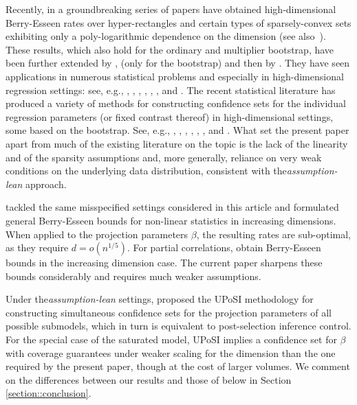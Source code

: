 \documentclass{article}
\begin{document}
 
 Recently, in a groundbreaking series of papers \cite{Cher13,chernozhukov2017detailed, chernozhukov2019improved} have obtained high-dimensional Berry-Esseen rates over hyper-rectangles and certain types of sparsely-convex sets exhibiting only a poly-logarithmic dependence on the dimension (see also~\citet{MR1115160}). These results, which also hold for the ordinary and multiplier bootstrap,   have been further extended by  \cite{2018arXiv180606153K}, \cite{hang.hzhang.bootstrap.17} (only for the bootstrap)  and then by \cite{koike2019high}. They have seen applications in numerous statistical problems and especially in high-dimensional regression settings: see, e.g., \cite{zhang2014confidence}, \cite{wasserman2014berry}, \cite{10.1093/biomet/asu056},  \cite{doi:10.1146/annurev-economics-012315-015826}, \cite{zhang2017simultaneous}, \cite{test}, \cite{boot}  and \cite{hang.hzhang.bootstrap.17}.
 The recent statistical literature has produced a variety of methods for constructing confidence sets for the individual regression parameters (or fixed contrast thereof) in high-dimensional settings, some based on the bootstrap. See, e.g., 
 \cite{javanmard2014confidence}, \cite{javanmard2018}, \cite{ning2017},  \cite{zhu2018,doi:10.1080/01621459.2017.1356319}, \cite{cai2017confidence}, \cite{ren2015}, \cite{rajen.peter.2018} and \cite{peter.sarah.2015}. 
 What set the present paper apart from much of the existing  literature on the topic is the lack of the linearity and of the sparsity assumptions and, more generally, reliance on very weak conditions on the underlying data distribution, consistent with the{\it assumption-lean} approach. 
 
 \cite{boot} tackled the same misspecified settings considered in this article and formulated general Berry-Esseen bounds for non-linear statistics 
 in increasing dimensions.
 When applied to the projection parameters $\beta$,
 the resulting rates are sub-optimal, as they require
 $d = o(n^{1/5})$.
 For partial correlations,
 \cite{wasserman2014berry}
 obtain Berry-Esseen bounds in the increasing dimension case.
 The current paper sharpens these bounds considerably and requires much weaker assumptions.
 
 Under the{\it assumption-lean} settings, \cite{kuchibhotla2018valid} proposed the UPoSI methodology for constructing simultaneous confidence sets for the projection parameters of all possible submodels, which in turn is equivalent to post-selection inference control. For the special case of the saturated model, UPoSI implies a confidence set for $\beta$ with coverage guarantees under weaker scaling for the dimension than the one required by the present paper, though at the cost of larger volumes. We comment on the differences between our results and those of  \cite{kuchibhotla2018valid} below in Section \ref{section::conclusion}.
 
\end{document}
